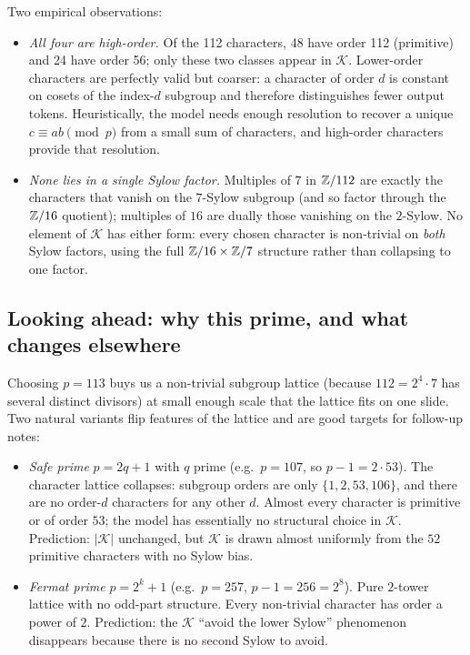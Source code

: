 Two empirical observations:

\begin{itemize}[leftmargin=*]
  \item \emph{All four are high-order.}  Of the 112 characters, 48 have
        order 112 (primitive) and 24 have order 56; only these two classes
        appear in $\mathcal K$.  Lower-order characters are perfectly valid
        but coarser: a character of order $d$ is constant on cosets of the
        index-$d$ subgroup and therefore distinguishes fewer output tokens.
        Heuristically, the model needs enough resolution to recover a unique
        $c \equiv ab \pmod p$ from a small sum of characters, and high-order
        characters provide that resolution.
  \item \emph{None lies in a single Sylow factor.}  Multiples of $7$ in
        $\mathbb{Z}/112$ are exactly the characters that vanish on the $7$-Sylow
        subgroup (and so factor through the $\mathbb{Z}/16$ quotient); multiples of
        $16$ are dually those vanishing on the $2$-Sylow.  No element of
        $\mathcal K$ has either form: every chosen character is non-trivial
        on \emph{both} Sylow factors, using the full $\mathbb{Z}/16 \times \mathbb{Z}/7$
        structure rather than collapsing to one factor.
\end{itemize}

\subsection{Looking ahead: why this prime, and what changes elsewhere}
\label{subsec:looking-ahead}

Choosing $p = 113$ buys us a non-trivial subgroup lattice (because
$112 = 2^4 \cdot 7$ has several distinct divisors) at small enough scale
that the lattice fits on one slide.  Two natural variants flip features of
the lattice and are good targets for follow-up notes:

\begin{itemize}[leftmargin=*]
  \item \emph{Safe prime} $p = 2q + 1$ with $q$ prime (e.g.\ $p = 107$, so
        $p - 1 = 2 \cdot 53$).  The character lattice collapses: subgroup
        orders are only $\{1, 2, 53, 106\}$, and there are no order-$d$
        characters for any other $d$.  Almost every character is primitive
        or of order $53$; the model has essentially no structural choice in
        $\mathcal K$.  Prediction: $|\mathcal K|$ unchanged, but $\mathcal K$
        is drawn almost uniformly from the $52$ primitive characters with
        no Sylow bias.
  \item \emph{Fermat prime} $p = 2^k + 1$ (e.g.\ $p = 257$, $p - 1 = 256 =
        2^8$).  Pure $2$-tower lattice with no odd-part structure.  Every
        non-trivial character has order a power of $2$.  Prediction: the
        $\mathcal K$ ``avoid the lower Sylow'' phenomenon disappears because
        there is no second Sylow to avoid.
\end{itemize}

